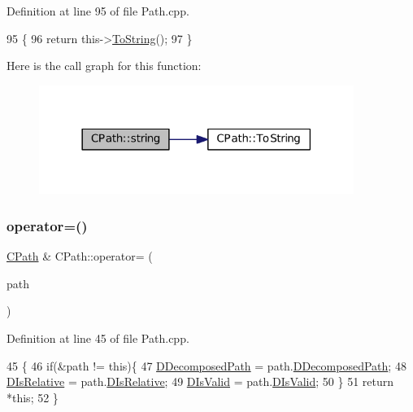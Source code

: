 Definition at line 95 of file Path.\+cpp.


\begin{DoxyCode}
95                                \{
96     \textcolor{keywordflow}{return} this->\hyperlink{classCPath_abbafaf377a7e38e0151bd9567d526951}{ToString}();
97 \}
\end{DoxyCode}
Here is the call graph for this function\+:
\nopagebreak
\begin{figure}[H]
\begin{center}
\leavevmode
\includegraphics[width=290pt]{classCPath_a8fade0e7a418c92d5f68ac8872dda8b1_cgraph}
\end{center}
\end{figure}
\hypertarget{classCPath_a6f3121638129c293fca7bbeecd8b0ad3}{}\label{classCPath_a6f3121638129c293fca7bbeecd8b0ad3} 
\subsubsection{\texorpdfstring{operator=()}{operator=()}}
{\footnotesize\ttfamily \hyperlink{classCPath}{C\+Path} \& C\+Path\+::operator= (\begin{DoxyParamCaption}\item[{const \hyperlink{classCPath}{C\+Path} \&}]{path }\end{DoxyParamCaption})}



Definition at line 45 of file Path.\+cpp.


\begin{DoxyCode}
45                                         \{
46     \textcolor{keywordflow}{if}(&path != \textcolor{keyword}{this})\{
47         \hyperlink{classCPath_a03ed25209a01e633c107a0c877fc61f8}{DDecomposedPath} = path.\hyperlink{classCPath_a03ed25209a01e633c107a0c877fc61f8}{DDecomposedPath};
48         \hyperlink{classCPath_af705ff149bb2281c67afb84fff550eb9}{DIsRelative} = path.\hyperlink{classCPath_af705ff149bb2281c67afb84fff550eb9}{DIsRelative};
49         \hyperlink{classCPath_a992aca27a1cba1c3bae3d04438821192}{DIsValid} = path.\hyperlink{classCPath_a992aca27a1cba1c3bae3d04438821192}{DIsValid};
50     \}
51     \textcolor{keywordflow}{return} *\textcolor{keyword}{this};
52 \}
\end{DoxyCode}
\hypertarget{classCPath_aaf49ee9d0f8ed1ffa6bb5e18aba86b4f}{}\label{classCPath_aaf49ee9d0f8ed1ffa6bb5e18aba86b4f} 
